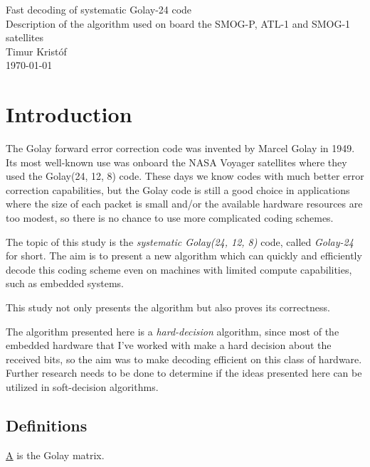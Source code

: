 \documentclass[11pt,a4paper,oneside]{report}             %
\def\doubleunderline#1{\underline{\underline{#1}}}
\begin{document}
\begin{titlepage}
\begin{center}
{\huge Fast decoding of systematic Golay-24 code } \\
\vspace{0.5cm}
{\small Description of the algorithm used on board the SMOG-P, ATL-1 and SMOG-1 satellites } \\
{\large Timur Kristóf } \\

\vfill
{\large \today}
\end{center}
\end{titlepage}

\chapter{Introduction}

The Golay forward error correction code was invented by Marcel Golay in 1949. Its most well-known
use was onboard the NASA Voyager satellites where they used the Golay(24, 12, 8) code. These days
we know codes with much better error correction capabilities, but the Golay code is still a good
choice in applications where the size of each packet is small and/or the available hardware
resources are too modest, so there is no chance to use more complicated coding schemes.

The topic of this study is the \emph{systematic Golay(24, 12, 8)} code, called \emph{Golay-24} for short.
The aim is to present a new algorithm which can quickly and efficiently
decode this coding scheme even on machines with limited compute capabilities,
such as embedded systems.

This study not only presents the algorithm but also proves its correctness.

The algorithm presented here is a \emph{hard-decision} algorithm, since most of the embedded hardware
that I've worked with make a hard decision about the received bits, so the aim was to make decoding
efficient on this class of hardware.
Further research needs to be done to determine if the ideas presented here can be utilized in soft-decision algorithms.

\section{Definitions}

\doubleunderline{A} is the Golay matrix.
\end{document}

